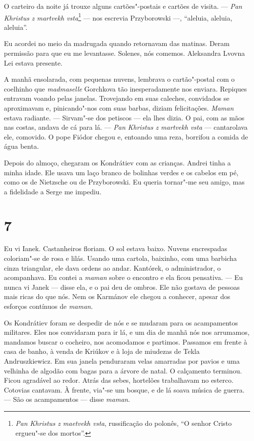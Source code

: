 O carteiro da noite já trouxe alguns cartões"-postais e cartões de
visita. --- \emph{Pan Khristus z martvekh vsta}\footnote{\emph{Pan
  Khristus z maetvekh vsta}, russificação do polonês, ``O senhor Cristo
  ergueu"-se dos mortos''.} --- nos escrevia Przyborowski ---, ``aleluia,
aleluia, aleluia''.

Eu acordei no meio da madrugada quando retornavam das matinas. Deram
permissão para que eu me levantasse. Solenes, nós comemos. Aleksandra
Lvovna Lei estava presente.

A manhã ensolarada, com pequenas nuvens, lembrava o cartão"-postal com o
coelhinho que \emph{madmaselle} Gorchkova tão inesperadamente nos
enviara. Repiques entravam voando pelas janelas. Trovejando em suas
caleches, convidados se aproximavam e, pinicando"-nos com suas barbas,
diziam felicitações. \emph{Maman} estava radiante. --- Sirvam"-se dos
petiscos --- ela lhes dizia. O pai, com as mãos nas costas, andava de cá
para lá. --- \emph{Pan Khristus z martvekh vsta} --- cantarolava ele,
comovido. O pope Fiódor chegou e, entoando uma reza, borrifou a comida
de água benta.

Depois do almoço, chegaram os Kondrátiev com as crianças. Andrei tinha a
minha idade. Ele usava um laço branco de bolinhas verdes e os cabelos em
pé, como os de Nietzsche ou de Przyborowski. Eu queria tornar"-me seu
amigo, mas a fidelidade a Serge me impediu.

\section{7}

Eu vi Ianek. Castanheiros floriam. O sol estava baixo. Nuvens
encrespadas coloriam"-se de rosa e lilás. Usando uma cartola, baixinho,
com uma barbicha cinza triangular, ele dava ordens ao andar. Kantórek, o
administrador, o acompanhava. Eu contei a \emph{maman} sobre o encontro
e ela ficou pensativa. --- Eu nunca vi Janek --- disse ela, e o pai deu
de ombros. Ele não gostava de pessoas mais ricas do que nós. Nem os
Karmánov ele chegou a conhecer, apesar dos esforços contínuos de
\emph{maman}.

Os Kondrátiev foram se despedir de nós e se mudaram para os acampamentos
militares. Eles nos convidaram para ir lá, e um dia de manhã nós nos
arrumamos, mandamos buscar o cocheiro, nos acomodamos e partimos.
Passamos em frente à casa de banho, à venda de Kriúkov e à loja de
miudezas de Tekla Andruszkiewicz. Em sua janela penduraram velas
amarradas por pavios e uma velhinha de algodão com bagas para a árvore %
de natal. O calçamento terminou. Ficou agradável ao redor. Atrás das
sebes, hortelões trabalhavam no esterco. Cotovias cantavam. À frente,
via"-se um bosque, e de lá soava música de guerra. --- São os
acampamentos --- disse \emph{maman}.

